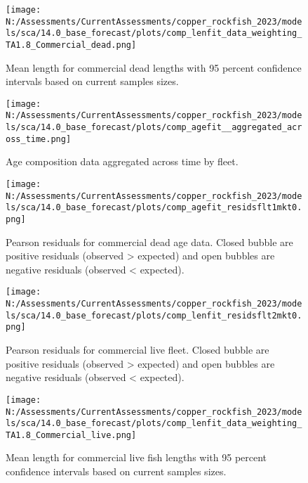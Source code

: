 \documentclass[11pt,
  english,
  letterpaper,
]{article}
\begin{document}
\pagebreak

\begin{figure}
\centering
\texttt{[image: N:/Assessments/CurrentAssessments/copper\_rockfish\_2023/models/sca/14.0\_base\_forecast/plots/comp\_lenfit\_data\_weighting\_TA1.8\_Commercial\_dead.png]}
\caption{Mean length for commercial dead lengths with 95 percent confidence intervals based on current samples sizes.\label{fig:com-dead-mean-len-fit}}
\end{figure}

\pagebreak

\begin{figure}
\centering
\texttt{[image: N:/Assessments/CurrentAssessments/copper\_rockfish\_2023/models/sca/14.0\_base\_forecast/plots/comp\_agefit\_\_aggregated\_across\_time.png]}
\caption{Age composition data aggregated across time by fleet.\label{fig:agg-marg-age-fit}}
\end{figure}

\pagebreak

\begin{figure}
\centering
\texttt{[image: N:/Assessments/CurrentAssessments/copper\_rockfish\_2023/models/sca/14.0\_base\_forecast/plots/comp\_agefit\_residsflt1mkt0.png]}
\caption{Pearson residuals for commercial dead age data. Closed bubble are positive residuals (observed \textgreater{} expected) and open bubbles are negative residuals (observed \textless{} expected).\label{fig:com-dead-age-pearson}}
\end{figure}

\pagebreak

\begin{figure}
\centering
\texttt{[image: N:/Assessments/CurrentAssessments/copper\_rockfish\_2023/models/sca/14.0\_base\_forecast/plots/comp\_lenfit\_residsflt2mkt0.png]}
\caption{Pearson residuals for commercial live fleet. Closed bubble are positive residuals (observed \textgreater{} expected) and open bubbles are negative residuals (observed \textless{} expected).\label{fig:com-live-pearson}}
\end{figure}

\pagebreak

\begin{figure}
\centering
\texttt{[image: N:/Assessments/CurrentAssessments/copper\_rockfish\_2023/models/sca/14.0\_base\_forecast/plots/comp\_lenfit\_data\_weighting\_TA1.8\_Commercial\_live.png]}
\caption{Mean length for commercial live fish lengths with 95 percent confidence intervals based on current samples sizes.\label{fig:com-live-mean-len-fit}}
\end{figure}
\end{document}
